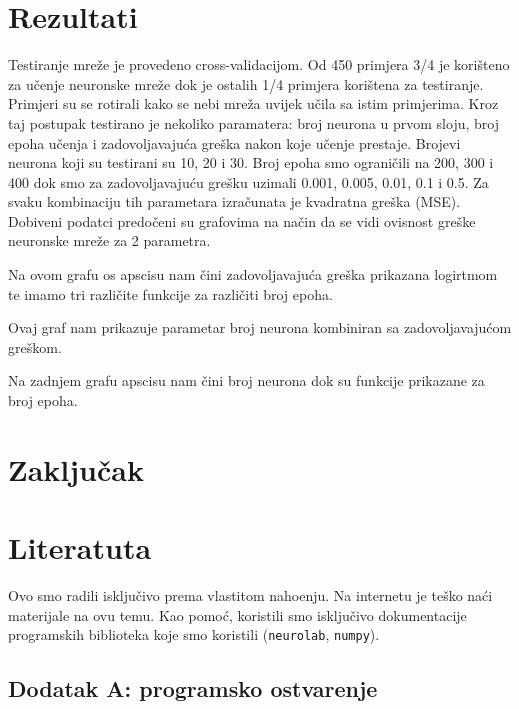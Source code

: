 \documentclass[a4paper,twocolumn,dvipdfm]{article}
\begin{document}
\section{Rezultati}

Testiranje mreže je provedeno cross-validacijom. Od 450 primjera 3/4 je
korišteno za učenje neuronske mreže dok je ostalih 1/4 primjera korištena za
testiranje. Primjeri su se rotirali kako se nebi mreža uvijek učila sa istim
primjerima. Kroz taj postupak testirano je nekoliko paramatera: broj neurona u
prvom sloju, broj epoha učenja i zadovoljavajuća greška nakon koje učenje
prestaje. Brojevi neurona koji su testirani su 10, 20 i 30. Broj epoha smo
ograničili na 200, 300 i 400 dok smo za zadovoljavajuću grešku uzimali 0.001,
0.005, 0.01, 0.1 i 0.5. Za svaku kombinaciju tih parametara izračunata je
kvadratna greška (MSE). Dobiveni podatci predočeni su grafovima na način da se
vidi ovisnost greške neuronske mreže za 2 parametra.

Na ovom grafu os apscisu nam čini zadovoljavajuća greška prikazana logirtmom te
imamo tri različite funkcije za različiti broj epoha.

Ovaj graf nam prikazuje parametar broj neurona kombiniran sa zadovoljavajućom greškom.

Na zadnjem grafu apscisu nam čini broj neurona dok su funkcije prikazane za broj epoha.

\section{Zaklju\v{c}ak}

\section*{Literatuta}

Ovo smo radili isklju\v{c}ivo prema vlastitom naho\dj enju. Na internetu
je te\v{s}ko na\'ci materijale na ovu temu. Kao pomo\'c, koristili smo
isklju\v{c}ivo dokumentacije programskih biblioteka koje smo koristili
(\texttt{neurolab}, \texttt{numpy}).

\subsection*{Dodatak A: programsko ostvarenje}
\end{document}
